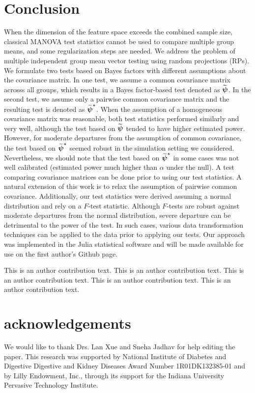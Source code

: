\documentclass[APA,Times1COL]{WileyNJDv5} %
\def\boldpsi{{\mbox{\boldmath $\psi$}}}
\begin{document}
\section{Conclusion} \label{sec:conclusion}
When the dimension of the feature space exceeds the combined sample size, classical MANOVA test statistics cannot be used to compare multiple group means, and some regularization steps are needed. We address the problem of multiple independent group mean vector testing using random projections (RPs). We formulate two tests based on Bayes factors with different assumptions about the covariance matrix. In one test, we assume a common covariance matrix acrosss all groups, which results in a Bayes factor-based test denoted as $\widetilde{\boldpsi}$. In the second test, we assume only a pairwise common covariance matrix and the resulting test is denoted as $\widetilde{\boldpsi}^{\star}$. When the assumption of a homogeneous covariance matrix was reasonable, both test statistics performed similarly and very well, although the test based on $\widetilde{\boldpsi}$ tended to have higher estimated power. However, for moderate departures from the assumption of common covariance, the test based on $\widetilde{\boldpsi}^{\star}$ seemed robust in the simulation setting we considered. Nevertheless, we should note that the test based on $\widetilde{\boldpsi}^{\star}$ in some cases was not well calibrated (estimated power much higher than $\alpha$ under the null). A test comparing covariance matrices can be done prior to using our test statistics.  A natural extension of this work is to relax the assumption of pairwise common covariance. Additionally, our test statistics were derived assuming a normal distribution and rely on a $F$-test statistic. Although $F$-tests are robust against moderate departures from the normal distribution, severe departure can be detrimental to the power of the test. In such cases, various data transformation techniques can be applied to the data prior to applying our tests. Our approach was implemented in the \textsf{Julia} \citep{bezanson2012julia} statistical software and will be made available for use on the first author's Github page.   


{}

This is an author contribution text. This is an author contribution text. This is an author contribution text. This is an author contribution text. This is an author contribution text.

\section*{acknowledgements}
We would like to thank Drs. Lan Xue and Sneha Jadhav for help editing the paper. This research was supported by National Institute of Diabetes and Digestive Digestive and Kidney Diseases Award Number 1R01DK132385-01 and by Lilly Endowment, Inc., through its support for the Indiana University Pervasive Technology Institute.
\end{document}
